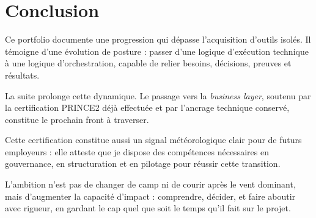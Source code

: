 \section{Conclusion}

Ce portfolio documente une progression qui dépasse l'acquisition d'outils isolés. Il témoigne d'une évolution de posture : passer d'une logique d'exécution technique à une logique d'orchestration, capable de relier besoins, décisions, preuves et résultats.

La suite prolonge cette dynamique. Le passage vers la \textit{business layer}, soutenu par la certification PRINCE2 déjà effectuée et par l'ancrage technique conservé, constitue le prochain front à traverser.

Cette certification constitue aussi un signal météorologique clair pour de futurs employeurs : elle atteste que je dispose des compétences nécessaires en gouvernance, en structuration et en pilotage pour réussir cette transition.

L'ambition n'est pas de changer de camp ni de courir après le vent dominant, mais d'augmenter la capacité d'impact : comprendre, décider, et faire aboutir avec rigueur, en gardant le cap quel que soit le temps qu'il fait sur le projet.

\clearpage
\ClearShipoutPictureBG